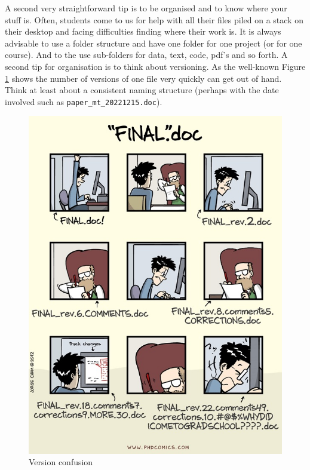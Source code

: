 \documentclass[
]{book}
\begin{document}
A second very straightforward tip is to be organised and to know where your stuff is. Often, students come to us for help with all their files piled on a stack on their desktop and facing difficulties finding where their work is. It is always advisable to use a folder structure and have one folder for one project (or for one course). And to the use sub-folders for data, text, code, pdf's and so forth. A second tip for organisation is to think about versioning. As the well-known Figure \ref{fig:version} shows the number of versions of one file very quickly can get out of hand. Think at least about a consistent naming structure (perhaps with the date involved such as \texttt{paper\_mt\_20221215.doc}).

\begin{figure}

{\centering \includegraphics[width=600px]{./figures/version} 

}

\caption{Version confusion}\label{fig:version}
\end{figure}
\end{document}
